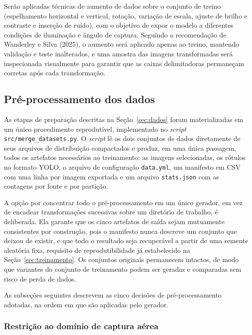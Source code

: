 \documentclass[12pt]{article}
\begin{document}
Serão aplicadas técnicas de aumento de dados sobre o conjunto de treino
(espelhamento horizontal e vertical, rotação, variação de escala, ajuste
de brilho e contraste e inserção de ruído), com o objetivo de expor o
modelo a diferentes condições de iluminação e ângulo de captura.
Seguindo a recomendação de Wanderley e Silva (2025), o aumento será
aplicado apenas ao treino, mantendo validação e teste inalterados, e uma
amostra das imagens transformadas será inspecionada visualmente para
garantir que as caixas delimitadoras permaneçam corretas após cada
transformação.

\subsection{Pré-processamento dos dados}
\label{sec:preprocessamento}

As etapas de preparação descritas na Seção~\ref{sec:dados} foram
materializadas em um único procedimento reprodutível, implementado no
\emph{script} \texttt{src/merge\_datasets.py}. O \emph{script} lê os dois
conjuntos de dados diretamente de seus arquivos de distribuição
compactados e produz, em uma única passagem, todos os artefatos
necessários ao treinamento: as imagens selecionadas, os rótulos no
formato YOLO, o arquivo de configuração \texttt{data.yml}, um manifesto
em CSV com uma linha por imagem exportada e um arquivo
\texttt{stats.json} com as contagens por fonte e por partição.

A opção por concentrar todo o pré-processamento em um único gerador, em
vez de encadear transformações sucessivas sobre um diretório de trabalho,
é deliberada. Ela garante que os cinco artefatos de saída sejam
mutuamente consistentes por construção, pois o manifesto nunca descreve
um conjunto que deixou de existir, e que todo o resultado seja
recuperável a partir de uma semente aleatória fixa, requisito de
reprodutibilidade já estabelecido na Seção~\ref{sec:treinamento}.
Os conjuntos originais permanecem intactos, de modo que variantes do
conjunto de treinamento podem ser geradas e comparadas sem risco de perda
de dados.

As subseções seguintes descrevem as cinco decisões de pré-processamento
adotadas, na ordem em que são aplicadas pelo gerador.

\subsubsection{Restrição ao domínio de captura aérea}
\label{sec:restricao-aerea}
\end{document}
